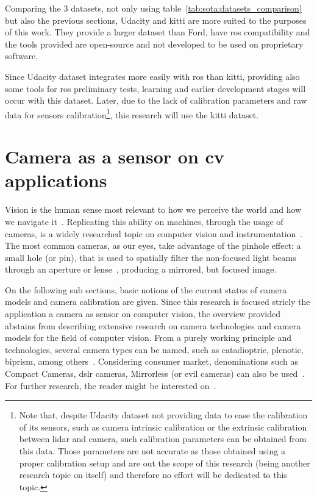 Comparing the 3 datasets, not only using table~\ref{tab:sota:datasets_comparison} but also the previous sections, Udacity and \ac{kitti} are more suited to the purposes of this work. They provide a larger dataset than Ford, have \ac{ros} compatibility and the tools provided are open-source and not developed to be used on proprietary software.

Since Udacity dataset integrates more easily with \ac{ros} than \ac{kitti}, providing also some tools for \ac{ros} preliminary tests, learning and earlier development stages will occur with this dataset. Later, due to the lack of calibration parameters and raw data for sensors calibration\footnote{Note that, despite Udacity dataset not providing data to ease the calibration of its sensors, such as camera intrinsic calibration or the extrinsic calibration between \ac{lidar} and camera, such calibration parameters can be obtained from this data. Those parameters are not accurate as those obtained using a proper calibration setup and are out the scope of this research (being another research topic on itself) and therefore no effort will be dedicated to this topic.}, this research will use the \ac{kitti} dataset.



\section{Camera as a sensor on \acl{cv} applications}
Vision is the human sense most relevant to how we perceive the world and how we navigate it~\cite{Ekstrom2015, Beck1983}. Replicating this ability on machines, through the usage of cameras, is a widely researched topic on computer vision and instrumentation~\cite{Beck1983}. The most common cameras, as our eyes, take advantage of the pinhole effect: a small hole (or pin), that is used to spatially filter the non-focused light beams through an aperture or lense~\cite{Beck1983, camera_models, Sturm2010}, producing a mirrored, but focused image.

On the following sub sections, basic notions of the current status of camera models and camera calibration are given. Since this research is focused stricly the application a camera as sensor on computer vision, the overview provided abstains from describing extensive research on camera technologies and camera models for the field of computer vision. From a purely working principle and technologies, several camera types can be named, such as catadioptric, plenotic, biprism, among others~\cite{Sturm2010}. Considering consumer market, denominations such as Compact Cameras, \ac{dslr} cameras, Mirrorless (or \ac{evil} cameras) can also be used~\cite{comercial_cameras}. For further research, the reader might be interested on~\cite{comercial_cameras, Sturm2010, camera_models, Merklinger1993, Photopillers}.


